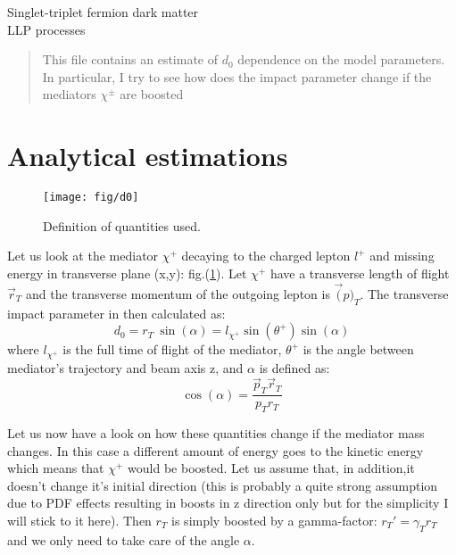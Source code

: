\documentclass[12pt,letterpaper,notitlepage]{article}
\begin{document}
\begin{center}
\LARGE Singlet-triplet fermion dark matter\\
\Large LLP processes
\end{center}

\vspace{1.0cm}
\begin{abstract}
\vspace{0.2cm}\noindent
This file contains an estimate of $d_0$ dependence on the model parameters. In particular, I try to see how does the impact parameter change if the mediators $\chi^\pm$ are boosted
\end{abstract}

\section{Analytical estimations}


\begin{figure}[h!]
\centering
\texttt{[image: fig/d0]}


\caption{\label{fig:d0} Definition of quantities used.}
\end{figure}

Let us look at the mediator $\chi^+$ decaying to the charged lepton $l^+$ and missing energy in transverse plane (x,y): fig.(\ref{fig:d0}). Let $\chi^+$ have a transverse length of flight $\vec{r}_T$ and the transverse momentum of the outgoing lepton is $\vec(p)_T$. The transverse impact parameter in then calculated as:
\begin{equation} \label{d0_init}
  d_0=r_T\ \sin (\alpha) = l_{\chi^+} \sin(\theta^+) \sin (\alpha)
\end{equation}
where $l_{\chi^+}$ is the full time of flight of the mediator, $\theta^+$ is the angle between mediator's trajectory and beam axis z, and $\alpha$ is defined as:
\begin{equation}
  \cos (\alpha) = \frac{\vec{p}_T \vec{r}_T}{p_T r_T}
\end{equation}

Let us now have a look on how these quantities change if the mediator mass changes. In this case a different amount of energy goes to the kinetic energy which means that $\chi^+$ would be boosted. Let us assume that, in addition,it doesn't change it's initial direction (this is probably a quite strong assumption due to PDF effects resulting in boosts in z direction only but for the simplicity I will stick to it here). Then $r_T$ is simply boosted by a gamma-factor: $r_T'=\gamma_T r_T$ and we only need to take care of the angle $\alpha$.
\end{document}
